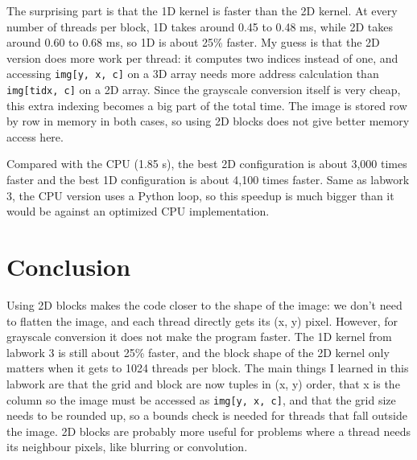 \documentclass[11pt]{article}
\begin{document}
The surprising part is that the 1D kernel is faster than the 2D kernel. At every number of threads per block, 1D takes around 0.45 to 0.48 ms, while 2D takes around 0.60 to 0.68 ms, so 1D is about 25\% faster. My guess is that the 2D version does more work per thread: it computes two indices instead of one, and accessing \texttt{img[y, x, c]} on a 3D array needs more address calculation than \texttt{img[tidx, c]} on a 2D array. Since the grayscale conversion itself is very cheap, this extra indexing becomes a big part of the total time. The image is stored row by row in memory in both cases, so using 2D blocks does not give better memory access here.

Compared with the CPU (1.85 s), the best 2D configuration is about 3,000 times faster and the best 1D configuration is about 4,100 times faster. Same as labwork 3, the CPU version uses a Python loop, so this speedup is much bigger than it would be against an optimized CPU implementation.

\section{Conclusion}

Using 2D blocks makes the code closer to the shape of the image: we don't need to flatten the image, and each thread directly gets its (x, y) pixel. However, for grayscale conversion it does not make the program faster. The 1D kernel from labwork 3 is still about 25\% faster, and the block shape of the 2D kernel only matters when it gets to 1024 threads per block. The main things I learned in this labwork are that the grid and block are now tuples in (x, y) order, that x is the column so the image must be accessed as \texttt{img[y, x, c]}, and that the grid size needs to be rounded up, so a bounds check is needed for threads that fall outside the image. 2D blocks are probably more useful for problems where a thread needs its neighbour pixels, like blurring or convolution.
\end{document}
